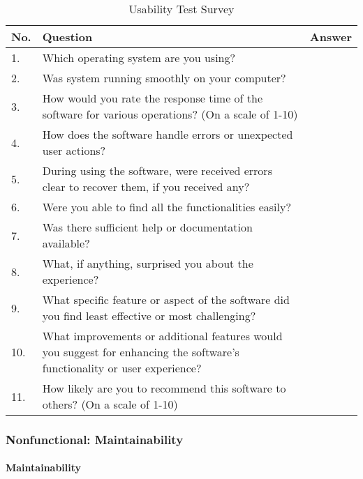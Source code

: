 \documentclass[12pt, titlepage]{article}
\begin{document}
\begin{table}[h!]
  \begin{center}
  \begin{tabular}{ p{0.5cm}|p{10cm}|c }
  \hline
  No. &  Question   & Answer \\
  \hline
  1. & Which operating system are you using?  & \\
  2. & Was system running smoothly on your computer?  & \\
  3. & How would you rate the response time of the software for various operations? (On a scale of 1-10) & \\
  4. & How does the software handle errors or unexpected user actions? & \\
  5. & During using the software, were received errors clear to recover them, if you received any? & \\
  6. & Were you able to find all the functionalities easily? & \\
  7. & Was there sufficient help or documentation available? & \\
  8. & What, if anything, surprised you about the experience? & \\
  9. & What specific feature or aspect of the software did you find least effective or most challenging? & \\
  10. & What improvements or additional features would you suggest for enhancing the software's functionality or user experience?  & \\
  11. & How likely are you to recommend this software to others? (On a scale of 1-10) & \\
  \hline
  \end{tabular}
  \caption{Usability Test Survey}
  \label{UsabilitySurvey}
  \end{center}
  \end{table}

\subsubsection{Nonfunctional: Maintainability} \label{NFMaintainablity}
		
\paragraph{Maintainability}
\end{document}
